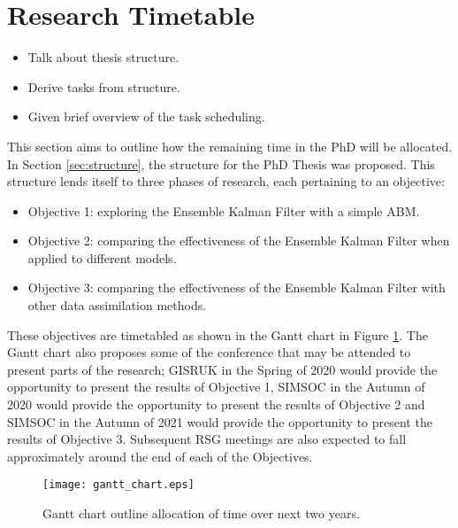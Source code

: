 \section{Research Timetable}\label{sec:timetable}

\begin{itemize}
    \item Talk about thesis structure.
    \item Derive tasks from structure.
    \item Given brief overview of the task scheduling.
\end{itemize}

This section aims to outline how the remaining time in the PhD will be
allocated.
In Section \ref{sec:structure}, the structure for the PhD Thesis was proposed.
This structure lends itself to three phases of research, each pertaining to an
objective:
\begin{itemize}
    \item Objective 1: exploring the Ensemble Kalman Filter with a simple ABM.
    \item Objective 2: comparing the effectiveness of the Ensemble Kalman Filter
        when applied to different models.
    \item Objective 3: comparing the effectiveness of the Ensemble Kalman Filter
        with other data assimilation methods.
\end{itemize}
These objectives are timetabled as shown in the Gantt chart in Figure
\ref{fig:gantt_chart}.
The Gantt chart also proposes some of the conference that may be attended to
present parts of the research; GISRUK in the Spring of 2020 would provide the
opportunity to present the results of Objective 1, SIMSOC in the Autumn of 2020
would provide the opportunity to present the results of Objective 2 and SIMSOC
in the Autumn of 2021 would provide the opportunity to present the results of
Objective 3.
Subsequent RSG meetings are also expected to fall approximately around the end
of each of the Objectives.

\begin{figure}[h!]
    \centering
    \texttt{[image: gantt\_chart.eps]}
    \caption{Gantt chart outline allocation of time over next two
    years.}\label{fig:gantt_chart}
\end{figure}
